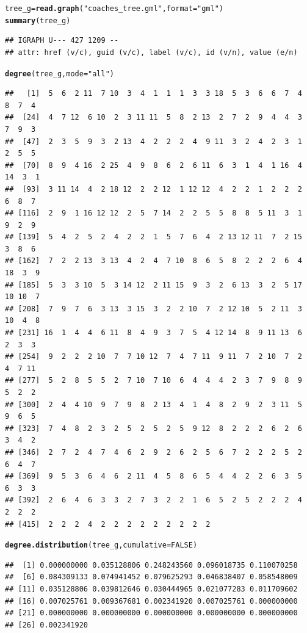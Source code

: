 \documentclass{article}\usepackage[]{graphicx}\usepackage[]{color}
\makeatletter
\newcommand{\hlnum}[1]{\textcolor[rgb]{0.686,0.059,0.569}{#1}}%
\newcommand{\hlstr}[1]{\textcolor[rgb]{0.192,0.494,0.8}{#1}}%
\newcommand{\hlstd}[1]{\textcolor[rgb]{0.345,0.345,0.345}{#1}}%
\newcommand{\hlkwb}[1]{\textcolor[rgb]{0.69,0.353,0.396}{#1}}%
\newcommand{\hlkwc}[1]{\textcolor[rgb]{0.333,0.667,0.333}{#1}}%
\newcommand{\hlkwd}[1]{\textcolor[rgb]{0.737,0.353,0.396}{\textbf{#1}}}%
\newenvironment{kframe}{%
 \def\at@end@of@kframe{}%
 \ifinner\ifhmode%
  \def\at@end@of@kframe{\end{minipage}}%
  \begin{minipage}{\columnwidth}%
 \fi\fi%
 \def\FrameCommand##1{\hskip\@totalleftmargin \hskip-\fboxsep
 \colorbox{shadecolor}{##1}\hskip-\fboxsep
     \hskip-\linewidth \hskip-\@totalleftmargin \hskip\columnwidth}%
 \MakeFramed {\advance\hsize-\width
   \@totalleftmargin\z@ \linewidth\hsize
   \@setminipage}}%
 {\par\unskip\endMakeFramed%
 \at@end@of@kframe}
\newenvironment{knitrout}{}{} %
\makeatother
\begin{document}
\begin{knitrout}
\color{fgcolor}\begin{kframe}
\begin{alltt}
\hlstd{tree_g} \hlkwb{=} \hlkwd{read.graph}\hlstd{(}\hlstr{"coaches_tree.gml"}\hlstd{,}\hlkwc{format}\hlstd{=}\hlstr{"gml"}\hlstd{)}
\hlkwd{summary}\hlstd{(tree_g)}
\end{alltt}
\begin{verbatim}
## IGRAPH U--- 427 1209 -- 
## attr: href (v/c), guid (v/c), label (v/c), id (v/n), value (e/n)
\end{verbatim}
\begin{alltt}
\hlkwd{degree}\hlstd{(tree_g,} \hlkwc{mode}\hlstd{=}\hlstr{"all"}\hlstd{)}
\end{alltt}
\begin{verbatim}
##   [1]  5  6  2 11  7 10  3  4  1  1  1  3  3 18  5  3  6  6  7  4  8  7  4
##  [24]  4  7 12  6 10  2  3 11 11  5  8  2 13  2  7  2  9  4  4  3  7  9  3
##  [47]  2  3  5  9  3  2 13  4  2  2  2  4  9 11  3  2  4  2  3  1  2  5  5
##  [70]  8  9  4 16  2 25  4  9  8  6  2  6 11  6  3  1  4  1 16  4 14  3  1
##  [93]  3 11 14  4  2 18 12  2  2 12  1 12 12  4  2  2  1  2  2  2  6  8  7
## [116]  2  9  1 16 12 12  2  5  7 14  2  2  5  5  8  8  5 11  3  1  9  2  9
## [139]  5  4  2  5  2  4  2  2  1  5  7  6  4  2 13 12 11  7  2 15  3  8  6
## [162]  7  2  2 13  3 13  4  2  4  7 10  8  6  5  8  2  2  2  6  4 18  3  9
## [185]  5  3  3 10  5  3 14 12  2 11 15  9  3  2  6 13  3  2  5 17 10 10  7
## [208]  7  9  7  6  3 13  3 15  3  2  2 10  7  2 12 10  5  2 11  3 10  4  8
## [231] 16  1  4  4  6 11  8  4  9  3  7  5  4 12 14  8  9 11 13  6  2  3  3
## [254]  9  2  2  2 10  7  7 10 12  7  4  7 11  9 11  7  2 10  7  2  4  7 11
## [277]  5  2  8  5  5  2  7 10  7 10  6  4  4  4  2  3  7  9  8  9  5  2  2
## [300]  2  4  4 10  9  7  9  8  2 13  4  1  4  8  2  9  2  3 11  5  9  6  5
## [323]  7  4  8  2  3  2  5  2  5  2  5  9 12  8  2  2  2  6  2  6  3  4  2
## [346]  2  7  2  4  7  4  6  2  9  2  6  2  5  6  7  2  2  2  5  2  6  4  7
## [369]  9  5  3  6  4  6  2 11  4  5  8  6  5  4  4  2  2  6  3  5  6  3  3
## [392]  2  6  4  6  3  3  2  7  3  2  2  1  6  5  2  5  2  2  2  4  2  2  2
## [415]  2  2  2  4  2  2  2  2  2  2  2  2  2
\end{verbatim}
\begin{alltt}
\hlkwd{degree.distribution}\hlstd{(tree_g,} \hlkwc{cumulative} \hlstd{=} \hlnum{FALSE}\hlstd{)}
\end{alltt}
\begin{verbatim}
##  [1] 0.000000000 0.035128806 0.248243560 0.096018735 0.110070258
##  [6] 0.084309133 0.074941452 0.079625293 0.046838407 0.058548009
## [11] 0.035128806 0.039812646 0.030444965 0.021077283 0.011709602
## [16] 0.007025761 0.009367681 0.002341920 0.007025761 0.000000000
## [21] 0.000000000 0.000000000 0.000000000 0.000000000 0.000000000
## [26] 0.002341920
\end{verbatim}
\end{kframe}
\end{knitrout}
\end{document}
